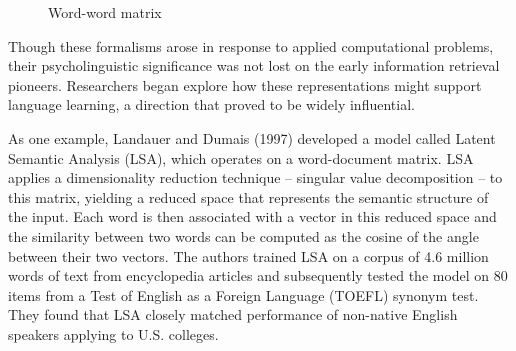 \documentclass[man,floatsintext]{apa6}
\begin{document}
\begin{figure}
  \begin{center}
    \footnotesize{}
    \caption{Word-word matrix}
    \label{matrix-word-word}
  \end{center}
\end{figure}

Though these formalisms arose in response to applied computational
problems, their psycholinguistic significance was not lost on the
early information retrieval pioneers. Researchers began explore how
these representations might support language learning, a direction
that proved to be widely influential.

As one example, Landauer and Dumais (1997) developed a model called
Latent Semantic Analysis (LSA), which operates on a word-document
matrix. LSA applies a dimensionality reduction technique -- singular
value decomposition -- to this matrix, yielding a reduced space that
represents the semantic structure of the input. Each word is then
associated with a vector in this reduced space and the similarity
between two words can be computed as the cosine of the angle between
their two vectors. The authors trained LSA on a corpus of 4.6 million
words of text from encyclopedia articles and subsequently tested the
model on 80 items from a Test of English as a Foreign Language (TOEFL)
synonym test. They found that LSA closely matched performance of
non-native English speakers applying to U.S. colleges.
\end{document}

